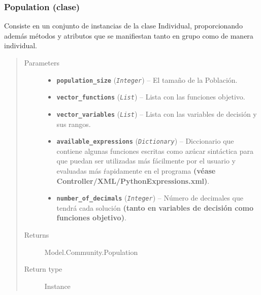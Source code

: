 \documentclass[class=report, crop=false]{standalone}
\begin{document}
\subsubsection{Population (clase)}
\label{sec:a_2_2_1}

\begin{fulllineitems}

\begin{DUlineblock}{0em}
\item[] Consiste en un conjunto de instancias de la clase Individual, 
proporcionando además métodos y atributos que se manifiestan 
tanto en grupo como de manera individual.
\end{DUlineblock}

\begin{quote}\begin{description}
\item[{Parameters}] \leavevmode\begin{itemize}
\item \textbf{\texttt{population\_size}} (\emph{\texttt{Integer}}) -- El tamaño de la Población.
\item \textbf{\texttt{vector\_functions}} (\emph{\texttt{List}}) -- Lista con las funciones objetivo.
\item \textbf{\texttt{vector\_variables}} (\emph{\texttt{List}}) -- Lista con las variables de decisión y sus rangos.
\item \textbf{\texttt{available\_expressions}} (\emph{\texttt{Dictionary}}) -- Diccionario que contiene algunas funciones escritas como azúcar sintáctica
para que puedan ser utilizadas más fácilmente por el usuario y evaluadas más ŕapidamente en el programa \textbf{(véase Controller/XML/PythonExpressions.xml)}.
\item \textbf{\texttt{number\_of\_decimals}} (\emph{\texttt{Integer}}) -- Número de decimales que tendrá cada solución \textbf{(tanto en variables de decisión como funciones objetivo)}.
\end{itemize}
\item[{Returns}] \leavevmode
Model.Community.Population
\item[{Return type}] \leavevmode
Instance
\end{description}\end{quote}


\begin{fulllineitems}


\end{fulllineitems}
\end{fulllineitems}
\end{document}
